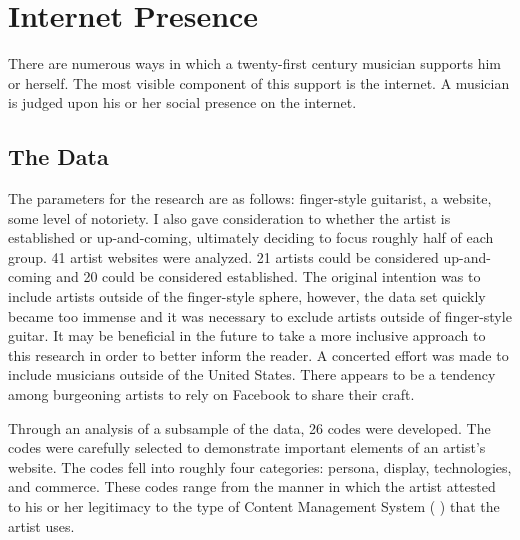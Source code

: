 \documentclass[unicode,hyperfootnotes=false,xetex,colorlinks=true,nofonts,nobib]{tufte-handout}
\newcommand{\textls}[2][5]{%
    \begingroup\addfontfeatures{LetterSpace=#1}#2\endgroup
  }
\renewcommand{\smallcapsspacing}[1]{\textls[10]{#1}}
\renewcommand{\textsc}[1]{\smallcapsspacing{\textsmallcaps{#1}}}
\begin{document}
\section{Internet Presence}
\label{sec:internet-presence}
There are numerous ways in which a twenty-first century musician supports him or herself. The most visible component of this support is the internet. A musician is judged upon his or her social presence on the internet.

\subsection{The Data}
\label{sec:data}
The parameters for the research are as follows: finger-style guitarist, a website, some level of notoriety. I also gave consideration to whether the artist is established or up-and-coming, ultimately deciding to focus roughly half of each group. 41 artist websites were analyzed. 21 artists could be considered up-and-coming and 20 could be considered established. The original intention was to include artists outside of the finger-style sphere, however, the data set quickly became too immense and it was necessary to exclude artists outside of finger-style guitar. It may be beneficial in the future to take a more inclusive approach to this research in order to better inform the reader. A concerted effort was made to include musicians outside of the United States. There appears to be a tendency among burgeoning artists to rely on Facebook to share their craft.

Through an analysis of a subsample of the data, 26 codes were developed. The codes were carefully selected to demonstrate important elements of an artist's website. The codes fell into roughly four categories: persona, display, technologies, and commerce. These codes range from the manner in which the artist attested to his or her legitimacy to the type of Content Management System (\textsc{cms}) that the artist uses.
\end{document}
